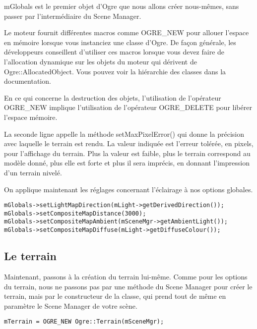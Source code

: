 mGlobals est le premier objet d'Ogre que nous allons cr\'eer nous-m\^emes, sans passer par l'interm\'ediaire du Scene Manager.

Le moteur fournit diff\'erentes macros comme OGRE\_NEW pour allouer l'espace en m\'emoire lorsque vous instanciez une classe d'Ogre. De fa\c{c}on g\'en\'erale, les d\'eveloppeurs conseillent d'utiliser ces macros lorsque vous devez faire de l'allocation dynamique sur les objets du moteur qui d\'erivent de Ogre::AllocatedObject. Vous pouvez voir la hi\'erarchie des classes dans la documentation.

En ce qui concerne la destruction des objets, l'utilisation de l'op\'erateur OGRE\_NEW implique l'utilisation de l'op\'erateur OGRE\_DELETE pour lib\'erer l'espace m\'emoire.

La seconde ligne appelle la m\'ethode setMaxPixelError() qui donne la pr\'ecision avec laquelle le terrain est rendu. La valeur indiqu\'ee est l'erreur tol\'er\'ee, en pixels, pour l'affichage du terrain. Plus la valeur est faible, plus le terrain correspond au mod\`ele donn\'e, plus elle est forte et plus il sera impr\'ecis, en donnant l'impression d'un terrain nivel\'e.

On applique maintenant les r\'eglages concernant l'\'eclairage \`a nos options globales.

\begin{lstlisting}[caption={Application des r\'eglages}]
mGlobals->setLightMapDirection(mLight->getDerivedDirection());
mGlobals->setCompositeMapDistance(3000);
mGlobals->setCompositeMapAmbient(mSceneMgr->getAmbientLight());
mGlobals->setCompositeMapDiffuse(mLight->getDiffuseColour());
\end{lstlisting}




\subsection{Le terrain}


Maintenant, passons \`a la cr\'eation du terrain lui-m\^eme. Comme pour les options du terrain, nous ne passons pas par une m\'ethode du Scene Manager pour cr\'eer le terrain, mais par le constructeur de la classe, qui prend tout de m\^eme en param\`etre le Scene Manager de votre sc\`ene.

\begin{lstlisting}[caption={Cr\'eation du terrain}]
mTerrain = OGRE_NEW Ogre::Terrain(mSceneMgr);
\end{lstlisting}

